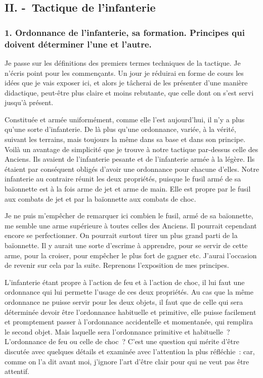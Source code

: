 \documentclass[french,twoside]{book} %
\begin{document}
\subsection[{II. - Tactique de l’infanterie}]{II. - Tactique de l’infanterie}
\subsubsection[{1. Ordonnance de l’infanterie, sa formation. Principes qui doivent déterminer l’une et l’autre.}]{1. Ordonnance de l’infanterie, sa formation. Principes qui doivent déterminer l’une et l’autre.}
\noindent Je passe sur les définitions des premiers termes techniques de la tactique. Je n’écris point pour les commençants. Un jour je réduirai en forme de cours les idées que je vais exposer ici, et alors je tâcherai de les présenter d’une manière didactique, peut-être plus claire et moins rebutante, que celle dont on s’est servi jusqu’à présent.\par
Constituée et armée uniformément, comme elle l’est aujourd’hui, il n’y a plus qu’une sorte d’infanterie. De là plus qu’une ordonnance, variée, à la vérité, suivant les terrains, mais toujours la même dans sa base et dans son principe. Voilà un avantage de simplicité que je trouve à notre tactique par-dessus celle des Anciens. Ils avaient de l’infanterie pesante et de l’infanterie armée à la légère. Ils étaient par conséquent obligés d’avoir une ordonnance pour chacune d’elles. Notre infanterie au contraire réunit les deux propriétés, puisque le fusil armé de sa baïonnette est à la fois arme de jet et arme de main. Elle est propre par le fusil aux combats de jet et par la baïonnette aux combats de choc.\par
Je ne puis m’empêcher de remarquer ici combien le fusil, armé de sa baïonnette, me semble une arme supérieure à toutes celles des Anciens. Il pourrait cependant encore se perfectionner. On pourrait surtout tirer un plus grand parti de la baïonnette. Il y aurait une sorte d’escrime à apprendre, pour se servir de cette arme, pour la croiser, pour empêcher le plus fort de gagner etc. J’aurai l’occasion de revenir sur cela par la suite. Reprenons l’exposition de mes principes.\par
L’infanterie étant propre à l’action de feu et à l’action de choc, il lui faut une ordonnance qui lui permette l’usage de ces deux propriétés. Au cas que la même ordonnance ne puisse servir pour les deux objets, il faut que de celle qui sera déterminée devoir être l’ordonnance habituelle et primitive, elle puisse facilement et promptement passer à l’ordonnance accidentelle et momentanée, qui remplira le second objet. Mais laquelle sera l’ordonnance primitive et habituelle ? L’ordonnance de feu ou celle de choc ? C’est une question qui mérite d’être discutée avec quelques détails et examinée avec l’attention la plus réfléchie : car, comme on l’a dit avant moi, j’ignore l’art d’être clair pour qui ne veut pas être attentif.\par
\end{document}
